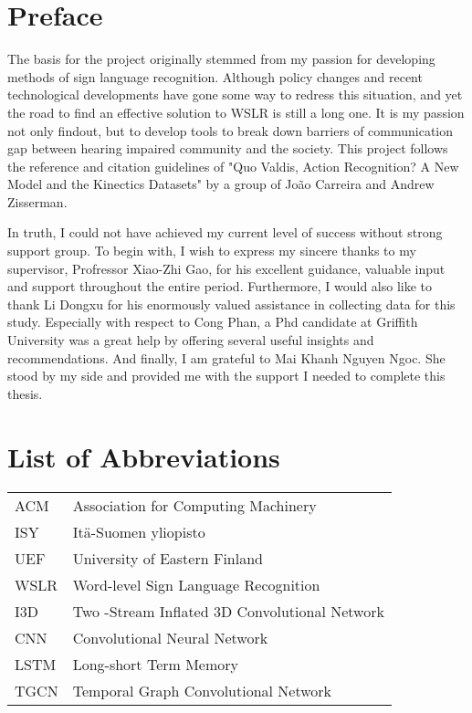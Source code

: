 \newpage



\section*{Preface}
The basis for the project originally stemmed from my passion for developing methods of sign language recognition. Although policy changes and recent technological developments have gone some way to redress this situation, and yet the road to find an effective solution to WSLR is still a long one. It is my passion not only findout, but to develop tools to break down barriers of communication gap between hearing impaired community and the society. This project follows the reference and citation guidelines of "Quo Valdis, Action Recognition? A New Model and the Kinectics Datasets" by a group of Jo\~{a}o Carreira and Andrew Zisserman.

In truth, I could not have achieved my current level of success without strong support group. To begin with, I wish to express my sincere thanks to my supervisor, Profressor Xiao-Zhi Gao, for his excellent guidance, valuable input and support throughout the entire period. Furthermore, I would also like to thank Li Dongxu for his enormously valued assistance in collecting data for this study. Especially with respect to Cong Phan, a Phd candidate at Griffith University was a great help by offering several useful insights and recommendations. And finally, I am grateful to Mai Khanh Nguyen Ngoc. She stood by my side and provided me with the support I needed to complete this thesis.
\newpage


\section*{List of Abbreviations}

\begin{tabular}{lp{12.5cm}}

ACM & Association for Computing Machinery \\

ISY & Itä-Suomen yliopisto \\

UEF & University of Eastern Finland\\

WSLR & Word-level Sign Language Recognition\\

I3D & Two -Stream Inflated 3D Convolutional Network\\

CNN & Convolutional Neural Network\\

LSTM & Long-short Term Memory\\

TGCN & Temporal Graph Convolutional Network\\

\end{tabular}

